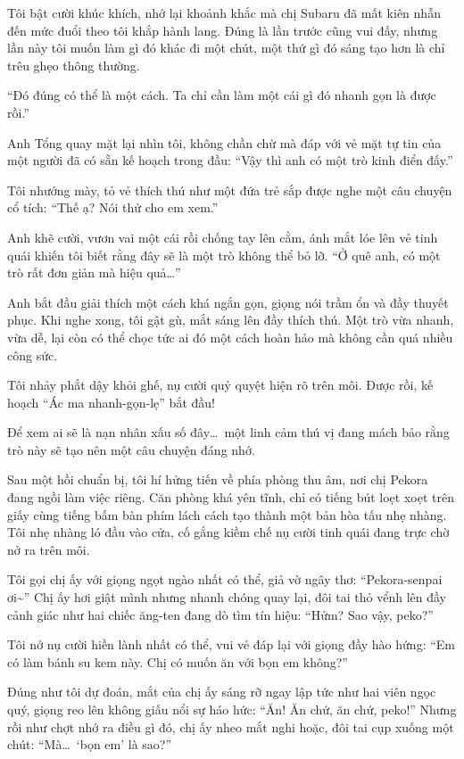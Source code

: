 \documentclass[../main.tex]{subfiles}
\begin{document}
Tôi bật cười khúc khích, nhớ lại khoảnh khắc mà chị Subaru đã mất kiên nhẫn đến mức đuổi theo tôi khắp hành lang. Đúng là lần trước cũng vui đấy, nhưng lần này tôi muốn làm gì đó khác đi một chút, một thứ gì đó sáng tạo hơn là chỉ trêu ghẹo thông thường.

``Đó đúng có thể là một cách. Ta chỉ cần làm một cái gì đó nhanh gọn là được rồi.''

Anh Tổng quay mặt lại nhìn tôi, không chần chừ mà đáp với vẻ mặt tự tin của một người đã có sẵn kế hoạch trong đầu: ``Vậy thì anh có một trò kinh điển đấy.''

Tôi nhướng mày, tỏ vẻ thích thú như một đứa trẻ sắp được nghe một câu chuyện cổ tích: ``Thế ạ? Nói thử cho em xem.''

Anh khẽ cười, vươn vai một cái rồi chống tay lên cằm, ánh mắt lóe lên vẻ tinh quái khiến tôi biết rằng đây sẽ là một trò không thể bỏ lỡ.
``Ở quê anh, có một trò rất đơn giản mà hiệu quả\dots''

Anh bắt đầu giải thích một cách khá ngắn gọn, giọng nói trầm ổn và đầy thuyết phục. Khi nghe xong, tôi gật gù, mắt sáng lên đầy thích thú. Một trò vừa nhanh, vừa dễ, lại còn có thể chọc tức ai đó một cách hoàn hảo mà không cần quá nhiều công sức.

Tôi nhảy phắt dậy khỏi ghế, nụ cười quỷ quyệt hiện rõ trên môi. Được rồi, kế hoạch ``Ác ma nhanh-gọn-lẹ'' bắt đầu!


Để xem ai sẽ là nạn nhân xấu số đây\dots\ một linh cảm thú vị đang mách bảo rằng trò này sẽ tạo nên một câu chuyện đáng nhớ.

\ct

Sau một hồi chuẩn bị, tôi hí hửng tiến về phía phòng thu âm, nơi chị Pekora đang ngồi làm việc riêng. Căn phòng khá yên tĩnh, chỉ có tiếng bút loẹt xoẹt trên giấy cùng tiếng bấm bàn phím lách cách tạo thành một bản hòa tấu nhẹ nhàng. Tôi nhẹ nhàng ló đầu vào cửa, cố gắng kiềm chế nụ cười tinh quái đang trực chờ nở ra trên môi.

Tôi gọi chị ấy với giọng ngọt ngào nhất có thể, giả vờ ngây thơ: ``Pekora-senpai ơi\~{}'' Chị ấy hơi giật mình nhưng nhanh chóng quay lại, đôi tai thỏ vểnh lên đầy cảnh giác như hai chiếc ăng-ten đang dò tìm tín hiệu: ``Hửm? Sao vậy, peko?''

Tôi nở nụ cười hiền lành nhất có thể, vui vẻ đáp lại với giọng đầy hào hứng: ``Em có làm bánh su kem này. Chị có muốn ăn với bọn em không?''

Đúng như tôi dự đoán, mắt của chị ấy sáng rỡ ngay lập tức như hai viên ngọc quý, giọng reo lên không giấu nổi sự háo hức: ``Ăn! Ăn chứ, ăn chứ, peko!''
Nhưng rồi như chợt nhớ ra điều gì đó, chị ấy nheo mắt nghi hoặc, đôi tai cụp xuống một chút: ``Mà\dots\ `bọn em' là sao?''
\end{document}
